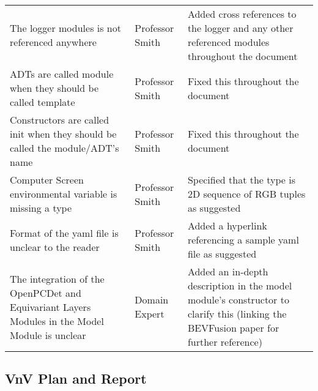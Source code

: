 \documentclass{article}
\begin{document}
\begin{longtable}{p{5cm}p{4cm}p{5cm}}
    The logger modules is not referenced anywhere & Professor Smith & Added cross references to the logger and any other referenced modules throughout the document \\
    \addlinespace[0.5cm]
    
    ADTs are called module when they should be called template & Professor Smith & Fixed this throughout the document \\
    \addlinespace[0.5cm]

    Constructors are called init when they should be called the module/ADT's name & Professor Smith & Fixed this throughout the document \\
    \addlinespace[0.5cm]

    Computer Screen environmental variable is missing a type & Professor Smith & Specified that the type is 2D sequence of RGB tuples as suggested \\
    \addlinespace[0.5cm]

    Format of the yaml file is unclear to the reader & Professor Smith & Added a hyperlink referencing a sample yaml file as suggested \\
    \addlinespace[0.5cm]

    The integration of the OpenPCDet and Equivariant Layers Modules in the Model Module is unclear & Domain Expert & Added an in-depth description in the model module's constructor to clarify this (linking the BEVFusion paper for further reference) \\
    \bottomrule
\end{longtable}

\newpage

\subsection{VnV Plan and Report}
\end{document}
